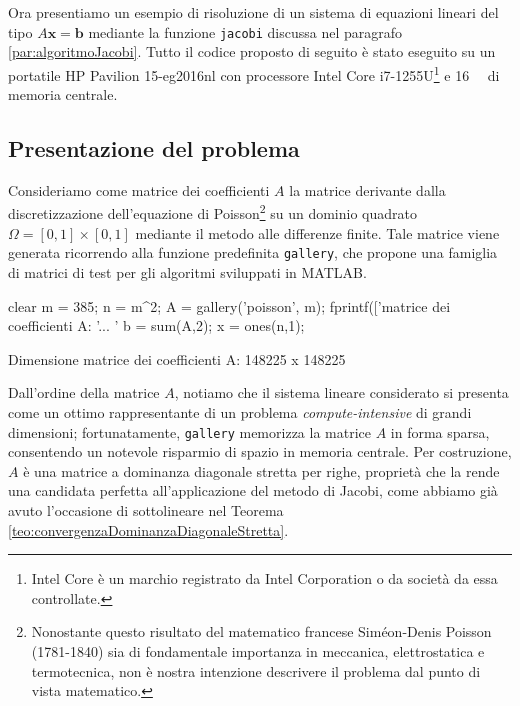 Ora presentiamo un esempio di risoluzione di un sistema di equazioni lineari del tipo $A\mathbf{x}=\mathbf{b}$ mediante la funzione
\lstinline{jacobi} discussa nel paragrafo \ref{par:algoritmoJacobi}. \newline
Tutto il codice proposto di seguito \`e stato eseguito su un portatile HP Pavilion 15-eg2016nl con processore Intel\textsuperscript{\textregistered} Core\textsuperscript{\texttrademark} i7-1255U\footnote{Intel Core \`e un marchio registrato da Intel Corporation o da societ\`a da essa controllate.} e \qty{16}{\giga\byte} di memoria centrale.
\subsection{Presentazione del problema}
Consideriamo come matrice dei coefficienti $A$ la matrice derivante dalla discretizzazione dell'equazione di Poisson\footnote{
    Nonostante questo risultato del matematico francese Sim\'eon-Denis Poisson (1781-1840) sia di fondamentale importanza in meccanica,
    elettrostatica e termotecnica, non \`e nostra intenzione descrivere il problema dal punto di vista matematico.} su un
dominio quadrato $\Omega=[0, 1]\times[0, 1]$ mediante il metodo alle differenze finite.
Tale matrice viene generata ricorrendo alla funzione predefinita \lstinline{gallery}, che propone una famiglia di matrici di test per gli algoritmi sviluppati in MATLAB.
\begin{matlabcode}
    clear
    m = 385;
    n = m^2;
    A = gallery('poisson', m);
    fprintf(['\nDimensione matrice dei coefficienti A: '...
             '%
    b = sum(A,2);
    x = ones(n,1);
\end{matlabcode}
\begin{matlaboutput}
    Dimensione matrice dei coefficienti A: 148225 x 148225
\end{matlaboutput}
Dall'ordine della matrice $A$, notiamo che il sistema lineare considerato si presenta come un ottimo rappresentante
di un problema \textit{compute-intensive} di grandi dimensioni; fortunatamente, \lstinline{gallery} memorizza la matrice $A$ in
forma sparsa, consentendo un notevole risparmio di spazio in memoria centrale.\newline
Per costruzione, $A$ \`e una matrice a dominanza diagonale stretta per righe, propriet\`a che la rende una candidata
perfetta all'applicazione del metodo di Jacobi, come abbiamo gi\`a avuto l'occasione di sottolineare nel Teorema
\ref{teo:convergenzaDominanzaDiagonaleStretta}.

